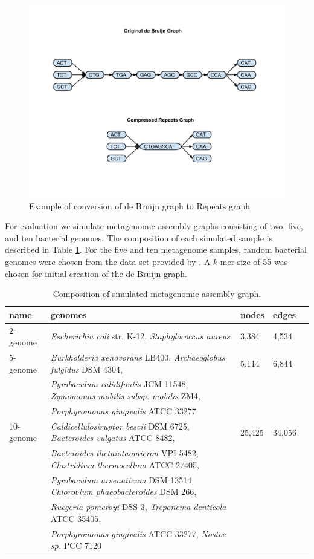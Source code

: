 \documentclass[runningheads,a4paper]{llncs}
\begin{document}
\begin{figure}[htbp]
\centering
\includegraphics[width = \textwidth]{repeatgraph}
\caption{Example of conversion of de Bruijn graph to Repeats graph}
\label{fig:repeatgraph}
\end{figure}

For evaluation we simulate metagenomic assembly graphs consisting of two, five, and ten bacterial genomes.
The composition of each simulated sample is described in Table \ref{tab:composition}.
For the five and ten metagenome samples, random bacterial genomes were chosen from the data set provided by \cite{shakya2013comparative}.
A $k$-mer size of 55 was chosen for initial creation of the de Bruijn graph.

\begin{table}[h]
\centering
\caption[]{Composition of simulated metagenomic assembly graph.}
\begin{tabular}{lllll}
name & genomes & nodes & edges \\
\hline
2-genome & \textit{Escherichia coli} str. K-12, \textit{Staphylococcus aureus}  & 3,384 & 4,534 \\
5-genome & \textit{Burkholderia xenovorans} LB400, \textit{Archaeoglobus fulgidus} DSM 4304, & 5,114 & 6,844 \\
& \textit{Pyrobaculum calidifontis} JCM 11548, \textit{Zymomonas mobilis subsp. mobilis} ZM4, \\
& \textit{Porphyromonas gingivalis} ATCC 33277  \\
10-genome  & \textit{Caldicellulosiruptor bescii} DSM 6725, \textit{Bacteroides vulgatus} ATCC 8482, & 25,425 & 34,056\\
& \textit{Bacteroides thetaiotaomicron} VPI-5482, \textit{Clostridium thermocellum} ATCC 27405, \\
& \textit{Pyrobaculum arsenaticum} DSM 13514, \textit{Chlorobium phaeobacteroides} DSM 266, \\
& \textit{Ruegeria pomeroyi} DSS-3, \textit{Treponema denticola} ATCC 35405, \\
& \textit{Porphyromonas gingivalis} ATCC 33277, \textit{Nostoc sp.} PCC 7120  \\
\hline 
\end{tabular}
\label{tab:composition}
\end{table}
\end{document}
